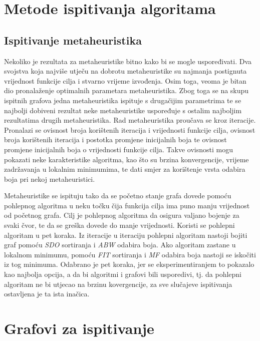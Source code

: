 \documentclass[times, utf8, diplomski, numeric]{fer}
\begin{document}
\section{Metode ispitivanja algoritama}


\subsection{Ispitivanje metaheuristika}

Nekoliko je rezultata za metaheuristike bitno kako bi se mogle uspoređivati. Dva svojstva koja najviše utječu na dobrotu metaheuristike su najmanja postignuta vrijednost funkcije cilja i stvarno vrijeme izvođenja. Osim toga, veoma je bitan dio pronalaženje optimalnih parametara metaheuristika. Zbog toga se na skupu ispitnih grafova jedna metaheuristika ispituje s drugačijim parametrima te se najbolji dobiveni rezultat neke metaheuristike uspoređuje s ostalim najboljim rezultatima drugih metaheuristika. Rad metaheuristika proučava se kroz iteracije. Pronalazi se ovisnost broja korištenih iteracija i vrijednosti funkcije cilja, ovisnost broja korištenih iteracija i postotka promjene inicijalnih boja te ovisnost promjene inicijalnih boja o vrijednosti funkcije cilja. Takve ovisnosti mogu pokazati neke karakteristike algoritma, kao što su brzina konvergencije, vrijeme zadržavanja u lokalnim minimumima, te dati smjer za korištenje vrsta odabira boja pri nekoj metaheuristici.

Metaheuristike se ispituju tako da se početno stanje grafa dovede pomoću pohlepnog algoritma u neku točku čija funkcija cilja ima puno manju vrijednost od početnog grafa. Cilj je pohlepnog algoritma da osigura valjano bojenje za svaki čvor, te da se greška dovede do manje vrijednosti. Koristi se pohlepni algoritam u pet koraka. Iz iteracije u iteraciju pohlepni algoritam nastoji bojiti graf pomoću \emph{SDO} sortiranja i \emph{ABW} odabira boja. Ako algoritam zastane u lokalnom minimumu, pomoću \emph{FIT} sortiranja i \emph{MF} odabira boja nastoji se iskočiti iz tog minimuma. Odabrano je pet koraka, jer se eksperimentiranjem to pokazalo kao najbolja opcija, a da bi algoritmi i grafovi bili usporedivi, tj. da pohlepni algoritam ne bi utjecao na brzinu kovergencije, za sve slučajeve ispitivanja ostavljena je ta ista inačica.

\section{Grafovi za ispitivanje}
\end{document}
